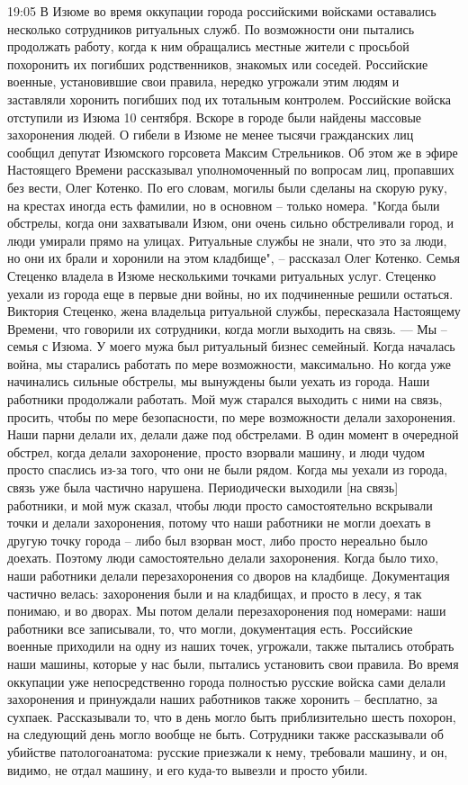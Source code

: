 19:05
В Изюме во время оккупации города российскими войсками оставались несколько сотрудников ритуальных служб. По возможности они пытались продолжать работу, когда к ним обращались местные жители с просьбой похоронить их погибших родственников, знакомых или соседей. Российские военные, установившие свои правила, нередко угрожали этим людям и заставляли хоронить погибших под их тотальным контролем.
Российские войска отступили из Изюма 10 сентября. Вскоре в городе были найдены массовые захоронения людей. О гибели в Изюме не менее тысячи гражданских лиц сообщил депутат Изюмского горсовета Максим Стрельников. Об этом же в эфире Настоящего Времени рассказывал уполномоченный по вопросам лиц, пропавших без вести, Олег Котенко. По его словам, могилы были сделаны на скорую руку, на крестах иногда есть фамилии, но в основном – только номера. "Когда были обстрелы, когда они захватывали Изюм, они очень сильно обстреливали город, и люди умирали прямо на улицах. Ритуальные службы не знали, что это за люди, но они их брали и хоронили на этом кладбище", – рассказал Олег Котенко.
Семья Стеценко владела в Изюме несколькими точками ритуальных услуг. Стеценко уехали из города еще в первые дни войны, но их подчиненные решили остаться. Виктория Стеценко, жена владельца ритуальной службы, пересказала Настоящему Времени, что говорили их сотрудники, когда могли выходить на связь.
— Мы – семья с Изюма. У моего мужа был ритуальный бизнес семейный. Когда началась война, мы старались работать по мере возможности, максимально. Но когда уже начинались сильные обстрелы, мы вынуждены были уехать из города. Наши работники продолжали работать. Мой муж старался выходить с ними на связь, просить, чтобы по мере безопасности, по мере возможности делали захоронения. Наши парни делали их, делали даже под обстрелами.
В один момент в очередной обстрел, когда делали захоронение, просто взорвали машину, и люди чудом просто спаслись из-за того, что они не были рядом.
Когда мы уехали из города, связь уже была частично нарушена. Периодически выходили [на связь] работники, и мой муж сказал, чтобы люди просто самостоятельно вскрывали точки и делали захоронения, потому что наши работники не могли доехать в другую точку города – либо был взорван мост, либо просто нереально было доехать. Поэтому люди самостоятельно делали захоронения.
Когда было тихо, наши работники делали перезахоронения со дворов на кладбище.
Документация частично велась: захоронения были и на кладбищах, и просто в лесу, я так понимаю, и во дворах. Мы потом делали перезахоронения под номерами: наши работники все записывали, то, что могли, документация есть.
Российские военные приходили на одну из наших точек, угрожали, также пытались отобрать наши машины, которые у нас были, пытались установить свои правила.
Во время оккупации уже непосредственно города полностью русские войска сами делали захоронения и принуждали наших работников также хоронить – бесплатно, за сухпаек. Рассказывали то, что в день могло быть приблизительно шесть похорон, на следующий день могло вообще не быть. Сотрудники также рассказывали об убийстве патологоанатома: русские приезжали к нему, требовали машину, и он, видимо, не отдал машину, и его куда-то вывезли и просто убили.

